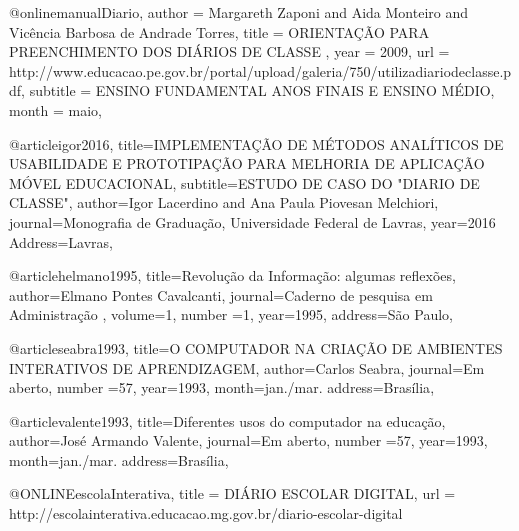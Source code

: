 @online{manualDiario,
	author = {Margareth Zaponi and Aida Monteiro and Vicência Barbosa de Andrade Torres},
	title = {ORIENTAÇÃO PARA PREENCHIMENTO DOS DIÁRIOS DE CLASSE
	},
	year = {2009},
	url = {http://www.educacao.pe.gov.br/portal/upload/galeria/750/utilizadiariodeclasse.pdf},
	subtitle = {ENSINO FUNDAMENTAL ANOS FINAIS E ENSINO MÉDIO},
	month = {maio},
}

@article{igor2016,
	title={IMPLEMENTAÇÃO DE MÉTODOS
		ANALÍTICOS DE USABILIDADE E
		PROTOTIPAÇÃO PARA MELHORIA DE
		APLICAÇÃO MÓVEL EDUCACIONAL},
	subtitle={ESTUDO DE CASO DO "DIARIO DE CLASSE"},
	author={Igor Lacerdino and Ana Paula Piovesan Melchiori},
	journal={Monografia de Graduação, Universidade Federal de Lavras},
	year={2016}
	Address={Lavras},
}

@article{helmano1995,
	title={Revolução da Informação: algumas reflexões},
	author={Elmano Pontes Cavalcanti},
	journal={Caderno de pesquisa em Administração },
	volume={1},
	number ={1},
	year={1995},
	address={São Paulo},
}

@article{seabra1993,
	title={O COMPUTADOR NA CRIAÇÃO DE AMBIENTES INTERATIVOS
		DE APRENDIZAGEM},
	author={Carlos Seabra},
	journal={Em aberto},
	number ={57},
	year={1993},
	month={jan./mar.}
	address={Brasília},
}

@article{valente1993,
	title={Diferentes usos do computador na educação},
	author={José Armando Valente},
	journal={Em aberto},
	number ={57},
	year={1993},
	month={jan./mar.}
	address={Brasília},
}

@ONLINE{escolaInterativa,
	title = {DIÁRIO ESCOLAR DIGITAL},
	url = {http://escolainterativa.educacao.mg.gov.br/diario-escolar-digital}
}
